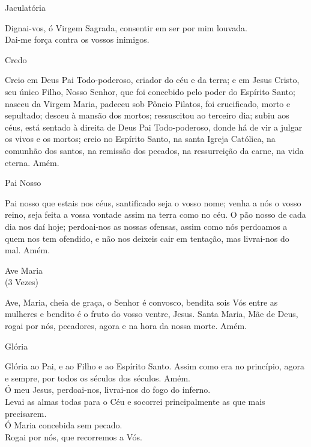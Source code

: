 \begin{center}
    Jaculatória
\end{center}
\begin{flushleft}
    \VbarRed{} Dignai-vos, ó Virgem Sagrada, consentir em ser por mim louvada. \\
    \RbarRed{} Dai-me força contra os vossos inimigos.
\end{flushleft}
\begin{center}
    Credo
\end{center}
\begin{flushleft}
    Creio em Deus Pai Todo-poderoso, criador do céu e da terra; e em Jesus Cristo, seu único Filho, Nosso Senhor, que foi concebido pelo poder do Espírito Santo; nasceu da Virgem Maria, padeceu sob Pôncio Pilatos, foi crucificado, morto e sepultado; desceu à mansão dos mortos; ressuscitou ao terceiro dia; subiu aos céus, está sentado à direita de Deus Pai Todo-poderoso, donde há de vir a julgar os vivos e os mortos; creio no Espírito Santo, na santa Igreja Católica, na comunhão dos santos, na remissão dos pecados, na ressurreição da carne, na vida eterna. Amém.
\end{flushleft}
\begin{center}
    Pai Nosso
\end{center}
\begin{flushleft}
    Pai nosso que estais nos céus, santificado seja o vosso nome; venha a nós o vosso reino, seja feita a vossa vontade assim na terra como no céu. O pão nosso de cada dia nos daí hoje; perdoai-nos as nossas ofensas, assim como nós perdoamos a quem nos tem ofendido, e não nos deixeis cair em tentação, mas livrai-nos do mal. Amém.
\end{flushleft}
\begin{center}
    Ave Maria \\ \textcolor{VioletRed3}{\scriptsize{(3 Vezes)}}
\end{center}
\begin{flushleft}
    Ave, Maria, cheia de graça, o Senhor é convosco, bendita sois Vós entre as mulheres e bendito é o fruto do vosso ventre, Jesus. Santa Maria, Mãe de Deus, rogai por nós, pecadores, agora e na hora da nossa morte. Amém.
\end{flushleft}
\begin{center}
    Glória
\end{center}
\begin{flushleft}
    Glória ao Pai, e ao Filho e ao Espírito Santo. Assim como era no princípio, agora e sempre, por todos os séculos dos séculos. Amém.
    \vspace{.2cm} \\
    \VbarRed{} Ó meu Jesus, perdoai-nos, livrai-nos do fogo do inferno. \\
    \RbarRed{} Levai as almas todas para o Céu e socorrei principalmente as que mais precisarem.
    \vspace{.2cm} \\
    \VbarRed{} Ó Maria concebida sem pecado.\\
    \RbarRed{} Rogai por nós, que recorremos a Vós.
\end{flushleft}
